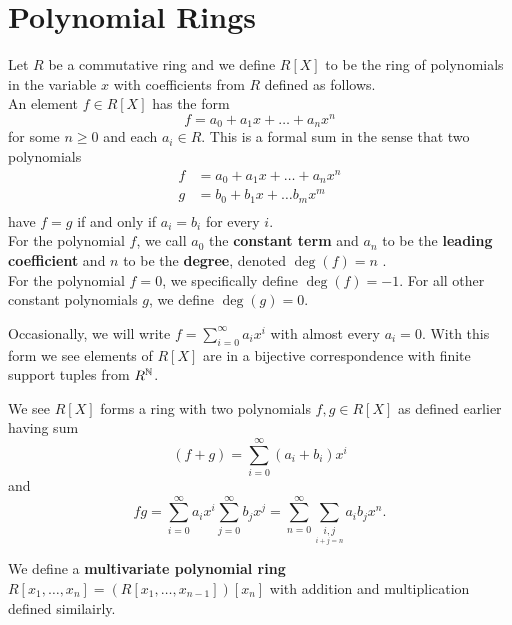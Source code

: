 \section{Polynomial Rings}
\begin{definition}
	Let \(R\) be a commutative ring and we define \(R\left[ X \right] \) to be the ring of polynomials in the variable \(x\) with coefficients from \(R\) defined as follows.\\
	An element \(f \in R\left[ X \right] \) has the form \[
	f = a_0 + a_1x + \ldots + a_{n} x^{n}
	\] for some \(n \ge 0\) and each \(a_{i} \in R\). This is a formal sum in the sense that two polynomials
	\begin{align*}
		f&= a_0 + a_1x + \ldots + a_{n}x^{n} \\
		g&= b_0 + b_1 x + \ldots b_{m} x^{m}  \\
	\end{align*} have \(f = g\) if and only if \(a_{i} = b_{i}\) for every \(i\).\\
For the polynomial \(f\), we call \(a_0\) the \textbf{constant term} and \(a_{n}\) to be the \textbf{leading coefficient} and \(n\) to be the \textbf{degree}, denoted \(\deg \left( f \right) = n\) .\\
For the polynomial \(f = 0\), we specifically define \(\deg \left(  f \right) = -1\). For all other constant polynomials \(g\), we define \(\deg \left( g \right) = 0\).
\end{definition}
\begin{remark}
	Occasionally, we will write \(f = \sum_{i=0}^{\infty} a_{i} x^{i}\) with almost every \(a_{i} = 0\). With this form we see elements of \(R\left[ X \right] \) are in a bijective correspondence with finite support tuples from \(R^{\mathbb{N}}\).
\end{remark}
We see \(R\left[ X \right] \) forms a ring with two polynomials \(f, g \in R\left[ X \right] \) as defined earlier having sum \[
	\left( f + g \right)  = \sum_{i=0}^{\infty} \left( a_{i} + b_{i} \right) x^{i}
\] and \[
fg = \sum_{i=0}^{\infty} a_{i} x^{i} \sum_{j=0 }^{\infty} b_{j}x^{j} = \sum_{n=0}^{\infty} \sum_{\underset{i + j = n}{i ,j}}^{}a_{i}b_{j} x^{n}
.\]
\begin{definition}
We define a \textbf{multivariate polynomial ring}	\(R \left[ x_1, \ldots, x_{n} \right] = \left( R\left[ x_1, \ldots, x_{n-1} \right]  \right) \left[ x_{n} \right]  \) with addition and multiplication defined similairly.
\end{definition}
